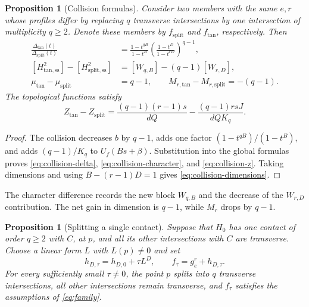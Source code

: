 \documentclass[11pt]{article}
\numberwithin{equation}{section}
\newtheorem{proposition}[theorem]{Proposition}
\theoremstyle{definition}
\theoremstyle{remark}
\begin{document}
\begin{proposition}[Collision formulas]\label{prop:collision}
Consider two members with the same $e,r$ whose profiles differ
by replacing $q$ transverse intersections by one intersection
of multiplicity $q\ge2$. Denote these members by
$f_{\mathrm{split}}$ and $f_{\mathrm{tan}}$, respectively.
Then
\begin{align}
 \frac{\Delta_{\mathrm{tan}}(t)}
      {\Delta_{\mathrm{split}}(t)}
   &=\frac{1-t^{qB}}{1-t^B}
        \left(\frac{1-t^D}{1-t^{rD}}\right)^{q-1},
        \label{eq:collision-delta}\\
 [H^2_{\mathrm{tan,ss}}]-[H^2_{\mathrm{split,ss}}]
   &=[W_{q,B}]-(q-1)[W_{r,D}],\label{eq:collision-character}\\
 \mu_{\mathrm{tan}}-\mu_{\mathrm{split}}&=q-1,\qquad
 M_{r,\mathrm{tan}}-M_{r,\mathrm{split}}=-(q-1).
        \label{eq:collision-dimensions}
\end{align}
The topological functions satisfy
\begin{equation}\label{eq:collision-z}
 Z_{\mathrm{tan}}-Z_{\mathrm{split}}
   =\frac{(q-1)(r-1)s}{dQ}
        -\frac{(q-1)rsJ}{dQK_q}.
\end{equation}
\end{proposition}

\begin{proof}
The collision decreases $b$ by $q-1$, adds one factor
$(1-t^{qB})/(1-t^B)$, and adds $(q-1)/K_q$ to
$U_f(Bs+\beta)$. Substitution into the global formulas proves
\eqref{eq:collision-delta}, \eqref{eq:collision-character},
and \eqref{eq:collision-z}. Taking dimensions and using
$B-(r-1)D=1$ gives \eqref{eq:collision-dimensions}.
\end{proof}

The character difference records the new block $W_{q,B}$ and
the decrease of the $W_{r,D}$ contribution. The net gain in
dimension is $q-1$, while $M_r$ drops by $q-1$.

\begin{proposition}[Splitting a single contact]\label{prop:splitting}
Suppose that $H_0$ has one contact of order $q\ge2$ with $C$,
at $p$, and all its other intersections with $C$ are transverse.
Choose a linear form $L$ with $L(p)\ne0$ and set
\begin{equation}\label{eq:splitting-family}
 h_{D,\tau}=h_{D,0}+\tau L^D,\qquad
 f_\tau=g_e^r+h_{D,\tau}.
\end{equation}
For every sufficiently small $\tau\ne0$, the point $p$ splits
into $q$ transverse intersections, all other intersections
remain transverse, and $f_\tau$ satisfies the assumptions
of \eqref{eq:family}.
\end{proposition}
\end{document}
